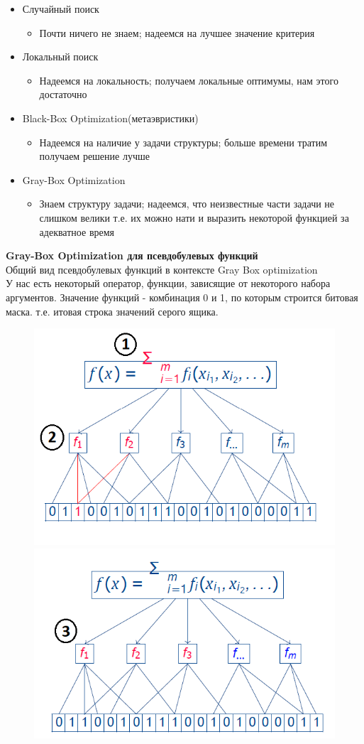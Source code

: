 \begin{itemize}
    \item Случайный поиск
    \begin{itemize}
        \item Почти ничего не знаем; надеемся на лучшее значение критерия
    \end{itemize}
     \item Локальный поиск
    \begin{itemize}
        \item Надеемся на локальность; получаем локальные оптимумы, нам этого достаточно
    \end{itemize}
     \item Black-Box Optimization(метаэвристики)
    \begin{itemize}
        \item Надеемся на наличие у задачи структуры; больше времени тратим получаем решение лучше
    \end{itemize}
    \item Gray-Box Optimization
    \begin{itemize}
        \item Знаем структуру задачи; надеемся, что неизвестные части задачи не слишком велики т.е. их можно нати и выразить некоторой функцией за адекватное время
    \end{itemize}
\end{itemize}
\textbf{Gray-Box Optimization для псевдобулевых функций}\\
Общий вид псевдобулевых функций в контексте Gray Box optimization\\
У нас есть некоторый оператор, функции, зависящие от некоторого набора аргументов. Значение функций - комбинация 0 и 1, по которым строится битовая маска. т.е. итовая строка значений серого ящика.
\begin{figure}[h]
\centering
\includegraphics[width=0.45\linewidth]{images/colorbox3.PNG}
\includegraphics[width=0.45\linewidth]{images/colorbox4.PNG}
\end{figure}
